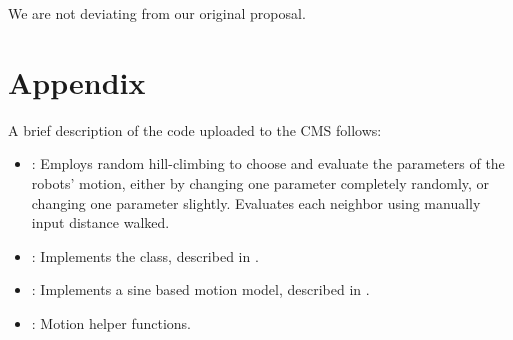 We are not deviating from our original proposal.



\section{Appendix}

A brief description of the code uploaded to the CMS follows:

\begin{itemize}
\item {}: Employs random hill-climbing to choose and
  evaluate the parameters of the robots’ motion, either by changing
  one parameter completely randomly, or changing one parameter
  slightly. Evaluates each neighbor using manually input distance
  walked.
\item {}: Implements the  class, described in
  .
\item {}: Implements a sine based motion model,
  described in .
\item {}: Motion helper functions.
\end{itemize}

